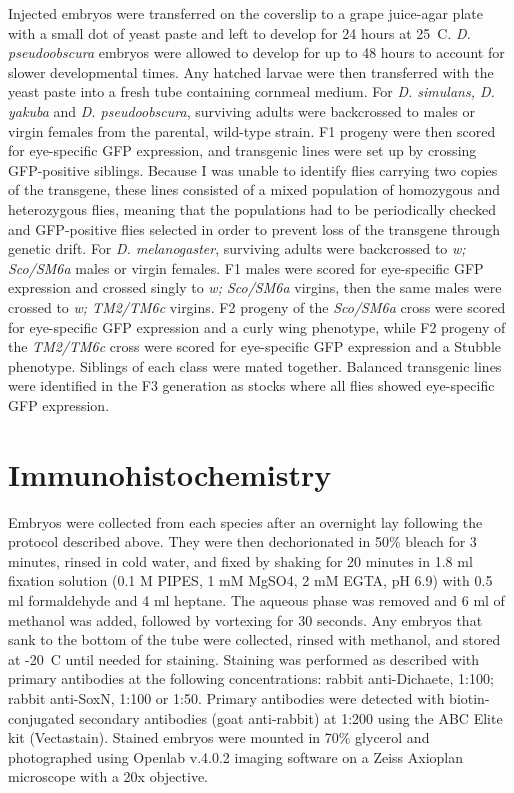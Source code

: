 Injected embryos were transferred on the coverslip to a grape juice-agar plate with a small dot of yeast paste and left to develop for 24 hours at 25\degree~C. \emph{D. pseudoobscura} embryos were allowed to develop for up to 48 hours to account for slower developmental times. Any hatched larvae were then transferred with the yeast paste into a fresh tube containing cornmeal medium. For \emph{D. simulans, D. yakuba} and \emph{D. pseudoobscura}, surviving adults were backcrossed to males or virgin females from the parental, wild-type strain. F1 progeny were then scored for eye-specific GFP expression, and transgenic lines were set up by crossing GFP-positive siblings. Because I was unable to identify flies carrying two copies of the transgene, these lines consisted of a mixed population of homozygous and heterozygous flies, meaning that the populations had to be periodically checked and GFP-positive flies selected in order to prevent loss of the transgene through genetic drift. For \emph{D. melanogaster}, surviving adults were backcrossed to \emph{w; Sco/SM6a} males or virgin females. F1 males were scored for eye-specific GFP expression and crossed singly to \emph{w; Sco/SM6a} virgins, then the same males were crossed to \emph{w; TM2/TM6c} virgins. F2 progeny of the \emph{Sco/SM6a} cross were scored for eye-specific GFP expression and a curly wing phenotype, while F2 progeny of the \emph{TM2/TM6c} cross were scored for eye-specific GFP expression and a Stubble phenotype. Siblings of each class were mated together. Balanced transgenic lines were identified in the F3 generation as stocks where all flies showed eye-specific GFP expression. 

\section{Immunohistochemistry}
Embryos were collected from each species after an overnight lay following the protocol described above. They were then dechorionated in 50\% bleach for 3 minutes, rinsed in cold water, and fixed by shaking for 20 minutes in 1.8 ml fixation solution (0.1 M PIPES, 1 mM MgSO4, 2 mM EGTA, pH 6.9) with 0.5 ml formaldehyde and 4 ml heptane. The aqueous phase was removed and 6 ml of methanol was added, followed by vortexing for 30 seconds. Any embryos that sank to the bottom of the tube were collected, rinsed with methanol, and stored at -20\degree~C until needed for staining. Staining was performed as described \citep{patel_imaging_1994} with primary antibodies at the following concentrations: rabbit anti-Dichaete, 1:100; rabbit anti-SoxN, 1:100 or 1:50. Primary antibodies were detected with biotin-conjugated secondary antibodies (goat anti-rabbit) at 1:200 using the ABC Elite kit (Vectastain). Stained embryos were mounted in 70\% glycerol and photographed using Openlab v.4.0.2 imaging software on a Zeiss Axioplan microscope with a 20x objective.

